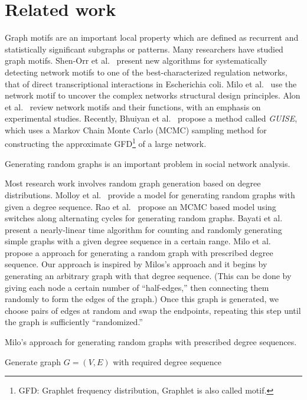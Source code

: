 \section{Related work}
\label{sec:related}

 Graph motifs are an important local property which are defined as recurrent and statistically significant subgraphs or patterns. Many researchers have studied graph motifs. 
Shen-Orr et al.~\cite{shen2002network} present new algorithms for systematically detecting network motifs to one of the best-characterized regulation networks, that of direct transcriptional interactions in Escherichia coli. 
Milo et al.~\cite{milo2002network} use the network motif to uncover the complex networks structural design principles.
Alon et al.~\cite{alon2007network} review network motifs and their functions, with an emphasis on experimental studies.
Recently, Bhuiyan et al.~\cite{bhuiyan2012guise} propose a method called \textit{GUISE}, which uses a Markov Chain Monte Carlo (MCMC) sampling method for constructing the approximate GFD\footnote{GFD: Graphlet frequency distribution, Graphlet is also called motif.} of a large network.

 Generating random graphs is an important problem in social network analysis. 

Most research work involves random graph generation based on degree distributions. 
Molloy et al.~\cite{molloy1995critical} provide a model for generating random graphs with given a degree sequence. 
Rao et al.~\cite{rao1996markov} propose an MCMC based model using switches along alternating cycles for generating random graphs. 
Bayati et al.~\cite{bayati2010sequential} present a nearly-linear time algorithm for counting and randomly generating simple graphs with a given degree sequence in a certain range. 
Milo et al.~\cite{milo04random} propose a approach for generating a random graph with prescribed degree sequence. Our approach is inspired by Milos's approach and it begins by generating an arbitrary graph with that degree sequence.  (This can be done by giving each node a certain number of ``half-edges,'' then connecting them randomly to form the edges of the graph.)  Once this graph is generated, we choose pairs of edges at random and swap the endpoints, repeating this step until the graph is sufficiently ``randomized.''

\begin{algorithm}
\caption{Milo's approach for generating random graphs with prescribed degree sequences.}
\label{algorithm:milo}
\begin{algorithmic}
Generate graph $G = (V, E)$ with required degree sequence\\
\end{algorithmic}
\end{algorithm}

